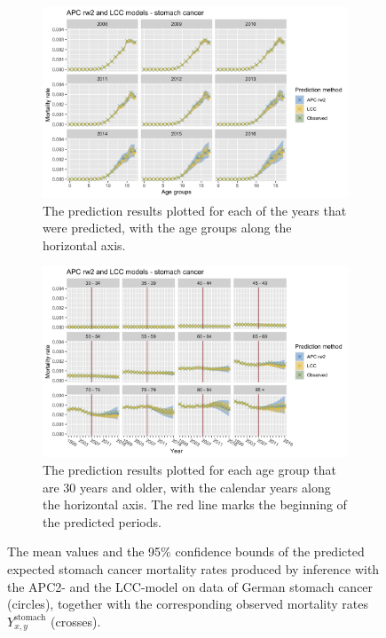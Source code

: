 \begin{figure}[h!]
    \centering
    \begin{subfigure}[b]{.6\linewidth}
        \includegraphics[width=\linewidth]{real-data/real-data-univariate/Figures/univariate-comparison-by-age-stomach.png}
        \caption{The prediction results plotted for each of the years that were predicted, with the age groups along the horizontal axis.}
        \label{fig:uv-comparison-stomach-top}
    \end{subfigure}
    
    \begin{subfigure}[b]{.6\linewidth}
        \includegraphics[width=\linewidth]{real-data/real-data-univariate/Figures/univariate-comparison-by-period-stomach.png}
        \caption{The prediction results plotted for each age group that are 30 years and older, with the calendar years along the horizontal axis. The red line marks the beginning of the predicted periods.}
        \label{fig:uv-comparison-stomach-bottom}
    \end{subfigure}
    \caption{The mean values and the 95\% confidence bounds of the predicted expected stomach cancer mortality rates produced by inference with the APC2- and the LCC-model on data of German stomach cancer (circles), together with the corresponding observed mortality rates $Y_{x,y}^{\text{stomach}}$ (crosses).}
    \label{fig:uv-comparison-stomach}
\end{figure}

